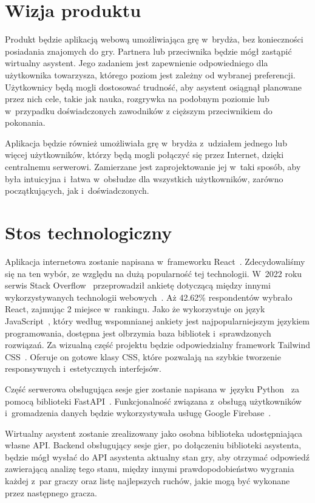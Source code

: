 \section{Wizja produktu}

Produkt będzie aplikacją webową umożliwiająca grę w~brydża,
bez konieczności posiadania znajomych do gry.
Partnera lub przeciwnika będzie mógł zastąpić wirtualny asystent.
Jego zadaniem jest zapewnienie odpowiedniego
dla użytkownika towarzysza, którego poziom jest zależny od wybranej
preferencji. Użytkownicy będą mogli dostosować trudność, aby asystent osiągnął
planowane przez nich cele, takie jak nauka, rozgrywka na podobnym poziomie
lub w~przypadku doświadczonych zawodników z cięższym przeciwnikiem do pokonania.

Aplikacja będzie również umożliwiała grę w~brydża z~udziałem jednego lub więcej użytkowników,
którzy będą mogli połączyć się przez Internet, dzięki centralnemu serwerowi.
Zamierzane jest zaprojektowanie jej w~taki sposób, aby była intuicyjna i~łatwa
w~obsłudze dla wszystkich użytkowników, zarówno początkujących, jak
i~doświadczonych.


\section{Stos technologiczny}

Aplikacja internetowa zostanie napisana w~frameworku React~\cite{React}.
Zdecydowaliśmy się na ten wybór, ze względu na dużą popularność tej
technologii. W~2022 roku serwis Stack Overflow~\cite{StackOverflow}
przeprowadził ankietę dotyczącą między innymi wykorzystywanych technologii
webowych~\cite{React-stack}. Aż 42.62\% respondentów wybrało React,
zajmując 2 miejsce w~rankingu. Jako że wykorzystuje on język JavaScript~\cite{JavaScript},
który według wspomnianej ankiety jest najpopularniejszym językiem programowania,
dostępna jest olbrzymia baza bibliotek i~sprawdzonych rozwiązań. Za wizualną
część projektu będzie odpowiedzialny framework Tailwind CSS~\cite{Tailwind}.
Oferuje on gotowe klasy CSS, które pozwalają na szybkie tworzenie responsywnych
i~estetycznych interfejsów.

Część serwerowa obsługująca sesje gier zostanie
napisana w~języku Python~\cite{Python} za pomocą biblioteki
FastAPI~\cite{FastAPI}. Funkcjonalność związana z~obsługą użytkowników
i~gromadzenia
danych będzie wykorzystywała usługę Google Firebase~\cite{Firebase}.

Wirtualny asystent zostanie zrealizowany jako osobna biblioteka udostępniająca
własne API. Backend obsługujący sesje gier, po dołączeniu biblioteki asystenta,
będzie mógł wysłać do API asystenta aktualny stan gry, aby otrzymać
odpowiedź zawierającą analizę tego stanu, między innymi
prawdopodobieństwo wygrania każdej z~par graczy oraz listę
najlepszych ruchów, jakie mogą być wykonane przez następnego gracza.

